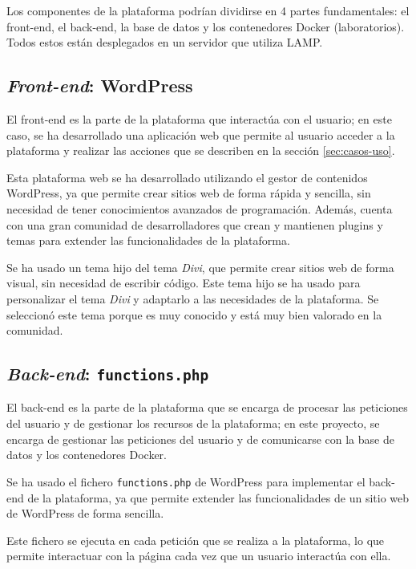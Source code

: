         Los componentes de la plataforma podrían dividirse en 4 partes fundamentales: el front-end, el back-end, la base de datos y los contenedores Docker (laboratorios). Todos estos están desplegados en un servidor que utiliza LAMP.

        \subsection{\textit{Front-end}: WordPress}

            El front-end es la parte de la plataforma que interactúa con el usuario; en este caso, se ha desarrollado una aplicación web que permite al usuario acceder a la plataforma y realizar las acciones que se describen en la sección \ref{sec:casos-uso}.
            
            Esta plataforma web se ha desarrollado utilizando el gestor de contenidos WordPress, ya que permite crear sitios web de forma rápida y sencilla, sin necesidad de tener conocimientos avanzados de programación. Además, cuenta con una gran comunidad de desarrolladores que crean y mantienen plugins y temas para extender las funcionalidades de la plataforma.

            Se ha usado un tema hijo del tema \textit{Divi}, que permite crear sitios web de forma visual, sin necesidad de escribir código. Este tema hijo se ha usado para personalizar el tema \textit{Divi} y adaptarlo a las necesidades de la plataforma. Se seleccionó este tema porque es muy conocido y está muy bien valorado en la comunidad.


        \subsection{\textit{Back-end}: \texttt{functions.php}}
        
            El back-end es la parte de la plataforma que se encarga de procesar las peticiones del usuario y de gestionar los recursos de la plataforma; en este proyecto, se encarga de gestionar las peticiones del usuario y de comunicarse con la base de datos y los contenedores Docker.
            
            Se ha usado el fichero \texttt{functions.php} de WordPress para implementar el back-end de la plataforma, ya que permite extender las funcionalidades de un sitio web de WordPress de forma sencilla.
            
            Este fichero se ejecuta en cada petición que se realiza a la plataforma, lo que permite interactuar con la página cada vez que un usuario interactúa con ella.

